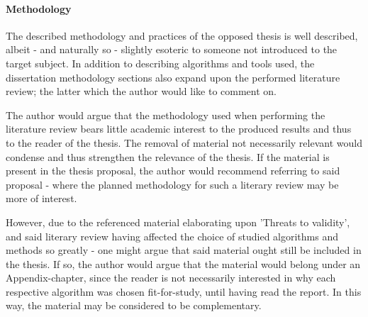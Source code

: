 
\paragraph{Methodology}
\label{par:methodology}
The described methodology and practices of the opposed thesis is well described, albeit - and naturally so - slightly esoteric to someone not introduced to the target subject.
In addition to describing algorithms and tools used, the dissertation methodology sections also expand upon the performed literature review; the latter which the author would like to comment on.

The author would argue that the methodology used when performing the literature review bears little academic interest to the produced results and thus to the reader of the thesis.
The removal of material not necessarily relevant would condense and thus strengthen the relevance of the thesis.
If the material is present in the thesis proposal, the author would recommend referring to said proposal - where the planned methodology for such a literary review may be more of interest.

However, due to the referenced material elaborating upon 'Threats to validity', and said literary review having affected the choice of studied algorithms and methods so greatly - one might argue that said material ought still be included in the thesis.
If so, the author would argue that the material would belong under an Appendix-chapter, since the reader is not necessarily interested in why each respective algorithm was chosen fit-for-study, until having read the report.
In this way, the material may be considered to be complementary.

